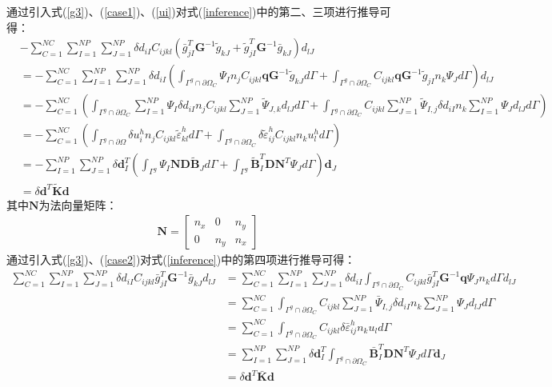 通过引入式(\ref{g3})、(\ref{case1})、(\ref{ui})对式(\ref{inference})中的第二、三项进行推导可得：
\begin{equation}
\begin{split}
    &-\sum_{C=1}^{N\!C}\sum_{I=1}^{N\!P}\sum_{J=1}^{N\!P}\delta d_{iI}C_{ijkl}(\bar{g}_{jI}^T\pmb{G}^{-1}\tilde{g}_{kJ}+\tilde{g}_{jI}^T\pmb{G}^{-1}\bar{g}_{kJ})d_{lJ}\\
    &=-\sum_{C=1}^{N\!C}\sum_{I=1}^{N\!P}\sum_{J=1}^{N\!P}\delta d_{iI}(\int_{\Gamma^g\cap\partial\Omega_C}\Psi_In_jC_{ijkl}\pmb{q}\pmb{G}^{-1}\tilde{g}_{kJ}d\Gamma+\int_{\Gamma^g\cap\partial\Omega_C}C_{ijkl}\pmb{q}\pmb{G}^{-1}\tilde{g}_{jI}n_k\Psi_Jd\Gamma)d_{lJ}\\
    &=-\sum_{C=1}^{N\!C}(\int_{\Gamma^g\cap\partial\Omega_C}\sum_{I=1}^{N\!P}\Psi_I\delta d_{iI}n_jC_{ijkl}\sum_{J=1}^{N\!P}\tilde{\Psi}_{J,k}d_{lJ}d\Gamma+\int_{\Gamma^g\cap\partial\Omega_C}C_{ijkl}\sum_{J=1}^{N\!P}\tilde{\Psi}_{I,j}\delta d_{iI}n_k\sum_{I=1}^{N\!P}\Psi_Jd_{lJ}d\Gamma)\\
    &=-\sum_{C=1}^{N\!C}(\int_{\Gamma^g\cap\partial\Omega}\delta u_i^hn_jC_{ijkl}\tilde{\varepsilon}_{kl}^hd\Gamma+\int_{\Gamma^g\cap\partial\Omega_C}\delta\tilde{\varepsilon}_{ij}^hC_{ijkl}n_ku^h_ld\Gamma)\\
    &=-\sum_{I=1}^{N\!P}\sum_{J=1}^{N\!P}\delta\pmb{d}_I^T(\int_{\Gamma^g}\Psi_I\pmb{N}\pmb{D}\tilde{\pmb{B}}_Jd\Gamma+\int_{\Gamma^g}\tilde{\pmb{B}}_I^T\pmb{D}\pmb{N}^T\Psi_Jd\Gamma)\pmb d_J\\
    &=\delta\pmb{d}^T\tilde{\pmb{K}}\pmb{d}
\end{split}
\end{equation}
其中$\pmb{N}$为法向量矩阵：
\begin{equation}
\begin{split}
    \pmb{N}=\left[\begin{matrix}n_x&0&n_y\\0&n_y&n_x
    \end{matrix}\right] 
\end{split}
\end{equation}
通过引入式(\ref{g3})、(\ref{case2})对式(\ref{inference})中的第四项进行推导可得：
\begin{equation}
\begin{split}
    \sum_{C=1}^{N\!C}\sum_{I=1}^{N\!P}\sum_{J=1}^{N\!P}\delta d_{iI}C_{ijkl}\bar{g}^T_{jI}\pmb{G}^{-1}\bar{g}_{kJ}d_{lJ}
    &=\sum_{C=1}^{N\!C}\sum_{I=1}^{N\!P}\sum_{J=1}^{N\!P}\delta d_{iI}\int_{\Gamma^g\cap\partial\Omega_C}C_{ijkl}\bar{g}_{jI}^T\pmb{G}^{-1}\pmb{q}\Psi_Jn_kd\Gamma d_{lJ}\\
    &=\sum_{C=1}^{N\!C}\int_{\Gamma^g\cap\partial\Omega_C}C_{ijkl}\sum_{J=1}^{N\!P}\bar{\Psi}_{I,j}\delta d_{iI}n_k\sum_{J=1}^{N\!P}\Psi_{J}d_{lJ}d\Gamma\\
    &=\sum_{C=1}^{N\!C}\int_{\Gamma^g\cap\partial\Omega_C}C_{ijkl}\delta\bar{\varepsilon}_{ij}^hn_ku_ld\Gamma\\
    &=\sum_{I=1}^{N\!P}\sum_{J=1}^{N\!P}\delta\pmb{d}_I^T\int_{\Gamma^g\cap\partial\Omega_C}\bar{\pmb{B}}_I^T\pmb{D}\pmb{N}^T\Psi_Jd\Gamma\pmb{d}_J\\
    &=\delta\pmb{d}^T\bar{\pmb{K}}\pmb{d}
\end{split}
\end{equation}
